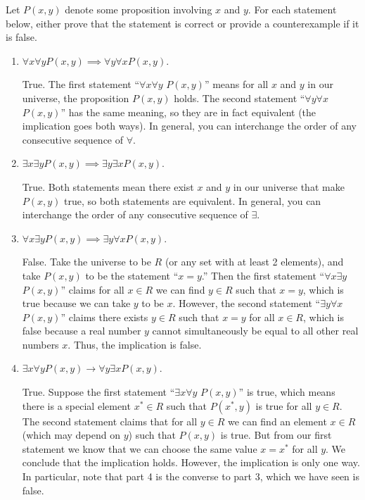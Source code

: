 \question Let $P(x, y)$ denote some proposition involving $x$ and $y$. 
For each statement below, either prove that the statement is correct 
or provide a counterexample if it is false.

\begin{enumerate}[label=\alph*.]
\item $\forall x \forall y P(x, y) \implies \forall y \forall x P(x, y)$.
\begin{solution}[1in]
True. The first statement “$\forall x\forall y$ $P(x, y)$” 
means for all $x$ and $y$ in our universe, the proposition $P(x, y)$ 
holds. The second statement “$\forall y \forall x $ $P(x, y)$” has 
the same meaning, so they are in fact equivalent (the implication goes 
both ways). In general, you can interchange the order of any consecutive 
sequence of $\forall$.
\end{solution}

\item $\exists x \exists y P(x, y) \implies \exists y \exists x P(x, y)$.
\begin{solution}[1in]
True. Both statements mean there exist $x$ and $y$ in our universe 
that make $P(x, y)$ true, so both statements are equivalent. In 
general, you can interchange the order of any consecutive sequence 
of $\exists$.
\end{solution}

\item $\forall x \exists y P(x, y) \implies \exists y \forall x P(x, y)$.
\begin{solution}[1in]
False. Take the universe to be $R$ (or any set with at least 2 
elements), and take $P(x, y)$ to be the statement “$x = y$.” Then 
the first statement “$\forall x \exists y$  $P(x, y)$” claims for all 
$x \in R$ we can find $y \in R$ such that $x = y$, which is true because
we can take $y$ to be $x$. However, the second statement 
“$\exists y \forall x$  $P(x, y)$” claims there exists $y \in R$ such
that $x = y$ for all $x \in R$, which is false because a real number 
$y$ cannot simultaneously be equal to all other real numbers $x$. 
Thus, the implication is false.
\end{solution}

\item $\exists x \forall y P(x, y) \rightarrow \forall y \exists x P(x, y)$.
\begin{solution}
True. Suppose the first statement “$\exists x \forall y$ $P(x, y)$” 
is true, which means there is a special element $x^* \in R$ such that 
$P(x^* , y)$ is true for all $y \in R$. The second statement claims 
that for all $y \in R$ we can find an element $x \in R$ (which may 
depend on $y$) such that $P(x, y)$ is true. But from our first 
statement we know that we can choose the same value $x = x^*$ for all 
$y$. We conclude that the implication holds. However, the 
implication is only one way. In particular, note that part 4 is the 
converse to part 3, which we have seen is false.
\end{solution}
\end{enumerate}